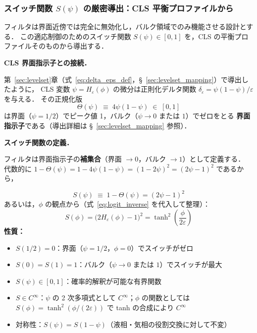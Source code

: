 \subsubsection{スイッチ関数 \texorpdfstring{$S(\psi)$}{S(psi)} の厳密導出：CLS 平衡プロファイルから}
\label{sec:dccd_switch}

フィルタは界面近傍では完全に無効化し，バルク領域でのみ機能させる設計とする．
この適応制御のためのスイッチ関数 $S(\psi) \in [0,1]$ を，CLS の平衡プロファイルそのものから導出する．

\medskip
\noindent\textbf{CLS 界面指示子との接続．}

第~\ref{sec:levelset}章（式~\eqref{eq:delta_eps_def}，§~\ref{sec:levelset_mapping}）で導出したように，
CLS 変数 $\psi = H_\varepsilon(\phi)$ の微分は正則化デルタ関数 $\delta_\varepsilon = \psi(1-\psi)/\varepsilon$ を与える．
その正規化版
\begin{equation}
  \Theta(\psi) \;\equiv\; 4\psi(1-\psi) \;\in\; [0, 1]
  \label{eq:interface_indicator}
\end{equation}
は界面（$\psi = 1/2$）でピーク値 1，バルク（$\psi \to 0$ または $1$）でゼロをとる
\textbf{界面指示子}である（導出詳細は §~\ref{sec:levelset_mapping} 参照）．

\medskip
\noindent\textbf{スイッチ関数の定義．}

フィルタは界面指示子の\textbf{補集合}（界面 $\to 0$，バルク $\to 1$）として定義する．
代数的に $1 - \Theta(\psi) = 1 - 4\psi(1-\psi) = (1-2\psi)^2 = (2\psi-1)^2$ であるから，

\begin{tcolorbox}[defbox, title={スイッチ関数 $S(\psi)$（CLS 平衡プロファイルからの導出）}]
\label{box:switch}
\begin{equation}
  \boxed{
    S(\psi) \;\equiv\; 1 - \Theta(\psi) = (2\psi - 1)^2
  }
  \label{eq:switch_function}
\end{equation}
あるいは，$\phi$ の観点から（式~\eqref{eq:logit_inverse} を代入して整理）：
\begin{equation}
  S(\phi) = \bigl(2H_\varepsilon(\phi) - 1\bigr)^2 = \tanh^2\!\left(\frac{\phi}{2\varepsilon}\right)
  \label{eq:switch_phi}
\end{equation}
\textbf{性質：}
\begin{itemize}
  \item $S(1/2) = 0$：界面（$\psi = 1/2$，$\phi = 0$）でスイッチがゼロ
  \item $S(0) = S(1) = 1$：バルク（$\psi \to 0$ または $1$）でスイッチが最大
  \item $S(\psi) \in [0,1]$：確率的解釈が可能な有界関数
  \item $S \in C^\infty$：$\psi$ の 2 次多項式として $C^\infty$；$\phi$ の関数としては $S(\phi) = \tanh^2(\phi/(2\varepsilon))$ で tanh の合成により $C^\infty$
  \item 対称性：$S(\psi) = S(1-\psi)$（液相・気相の役割交換に対して不変）
\end{itemize}
\end{tcolorbox}

